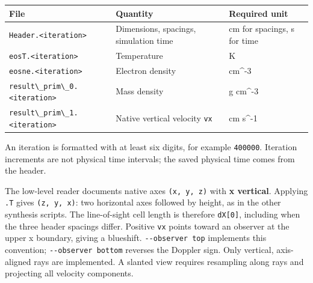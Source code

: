 \documentclass[
]{article}
\newcommand{\passthrough}[1]{#1}
\newcounter{none} %
\begin{document}
{\def\LTcaptype{none} %
\begin{longtable}[]{@{}
  >{\raggedright\arraybackslash}p{}
  >{\raggedright\arraybackslash}p{}
  >{\raggedright\arraybackslash}p{}@{}}
\toprule\noalign{}
\begin{minipage}[b]{\linewidth}\raggedright
File
\end{minipage} & \begin{minipage}[b]{\linewidth}\raggedright
Quantity
\end{minipage} & \begin{minipage}[b]{\linewidth}\raggedright
Required unit
\end{minipage} \\
\midrule\noalign{}
\endhead
\bottomrule\noalign{}
\endlastfoot
\passthrough{\lstinline!Header.<iteration>!} & Dimensions, spacings,
simulation time & cm for spacings, s for time \\
\passthrough{\lstinline!eosT.<iteration>!} & Temperature & K \\
\passthrough{\lstinline!eosne.<iteration>!} & Electron density &
cm\^{}-3 \\
\passthrough{\lstinline!result\_prim\_0.<iteration>!} & Mass density & g
cm\^{}-3 \\
\passthrough{\lstinline!result\_prim\_1.<iteration>!} & Native vertical
velocity \passthrough{\lstinline!vx!} & cm s\^{}-1 \\
\end{longtable}
}

An iteration is formatted with at least six digits, for example
\passthrough{\lstinline!400000!}. Iteration increments are not physical
time intervals; the saved physical time comes from the header.

The low-level reader documents native axes
\passthrough{\lstinline!(x, y, z)!} with \textbf{x vertical}. Applying
\passthrough{\lstinline!.T!} gives \passthrough{\lstinline!(z, y, x)!}:
two horizontal axes followed by height, as in the other synthesis
scripts. The line-of-sight cell length is therefore
\passthrough{\lstinline!dX[0]!}, including when the three header
spacings differ. Positive \passthrough{\lstinline!vx!} points toward an
observer at the upper x boundary, giving a blueshift.
\passthrough{\lstinline!--observer top!} implements this convention;
\passthrough{\lstinline!--observer bottom!} reverses the Doppler sign.
Only vertical, axis-aligned rays are implemented. A slanted view
requires resampling along rays and projecting all velocity components.
\end{document}
